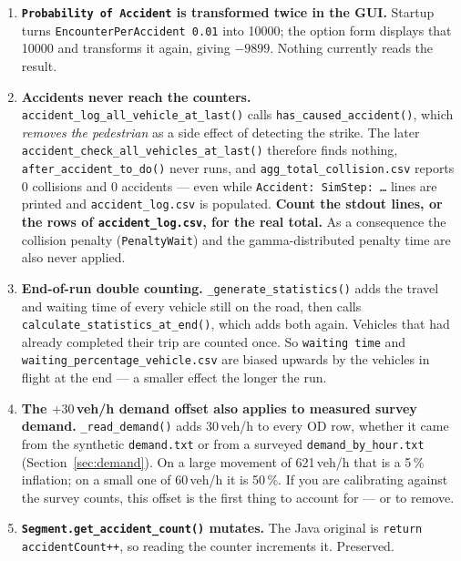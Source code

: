 \documentclass[11pt, a4paper]{article}
\newcommand{\code}[1]{\texttt{#1}}
\begin{document}
\begin{enumerate}
    \item \label{quirk:accprob} \textbf{\code{Probability of Accident} is
    transformed twice in the GUI.} Startup turns
    \code{EncounterPerAccident 0.01} into 10000; the option form displays that
    10000 and transforms it again, giving $-9899$. Nothing currently reads the
    result.

    \item \label{quirk:accidents} \textbf{Accidents never reach the counters.}
    \code{accident\_log\_all\_vehicle\_at\_last()} calls
    \code{has\_caused\_accident()}, which \emph{removes the pedestrian} as a side
    effect of detecting the strike. The later
    \code{accident\_check\_all\_vehicles\_at\_last()} therefore finds nothing,
    \code{after\_accident\_to\_do()} never runs, and
    \code{agg\_total\_collision.csv} reports 0 collisions and 0 accidents ---
    even while \code{Accident: SimStep: \dots} lines are printed and
    \code{accident\_log.csv} is populated. \textbf{Count the stdout lines, or the
    rows of \code{accident\_log.csv}, for the real total.} As a consequence the
    collision penalty (\code{PenaltyWait}) and the gamma-distributed penalty time
    are also never applied.

    \item \textbf{End-of-run double counting.} \code{\_generate\_statistics()}
    adds the travel and waiting time of every vehicle still on the road, then
    calls \code{calculate\_statistics\_at\_end()}, which adds both again.
    Vehicles that had already completed their trip are counted once. So
    \code{waiting time} and \code{waiting\_percentage\_vehicle.csv} are biased
    upwards by the vehicles in flight at the end --- a smaller effect the longer
    the run.

    \item \textbf{The $+30$\,veh/h demand offset also applies to measured
    survey demand.} \code{\_read\_demand()} adds 30\,veh/h to every OD row,
    whether it came from the synthetic \code{demand.txt} or from a surveyed
    \code{demand\_by\_hour.txt} (Section~\ref{sec:demand}). On a large movement
    of 621\,veh/h that is a 5\,\% inflation; on a small one of 60\,veh/h it is
    50\,\%. If you are calibrating against the survey counts, this offset is the
    first thing to account for --- or to remove.

    \item \textbf{\code{Segment.get\_accident\_count()} mutates.} The Java
    original is \code{return accidentCount++}, so reading the counter increments
    it. Preserved.


\end{enumerate}
\end{document}
